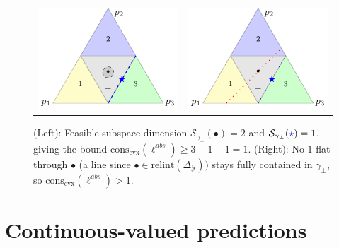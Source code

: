 \documentclass[anon,12pt]{colt2021} %
\newcommand{\simplex}{\Delta_\Y}
\newcommand{\relint}[1]{\mathrm{relint}(#1)}
\newcommand{\conscvx}{\mathrm{cons}_\mathrm{cvx}}
\newcommand{\Sc}{\mathcal{S}}  %
\newcommand{\Y}{\mathcal{Y}}
\begin{document}
\begin{figure}[htb]
	\centering
	\begin{tabular}{cc}
		\includegraphics[width=.45\textwidth]{tikz/fsd-bound.pdf} &
		\includegraphics[width=.45\textwidth]{tikz/flats-bound.pdf} \\
	\end{tabular}
	\caption{(Left): Feasible subspace dimension $\Sc_{\gamma_\bot}(\bullet) = 2$ and $\Sc_{\gamma_\bot}({\color{blue}\star}) = 1$, giving the bound $\conscvx(\ell^{abs}) \geq 3- 1-1 = 1$.  (Right): No $1$-flat through $\bullet$ (a line since $\bullet \in \relint{\simplex})$  stays fully contained in $\gamma_\bot$, so $\conscvx(\ell^{abs}) > 1$.}
	\label{fig:fsd-flats-abstain}
\end{figure}

\section{Continuous-valued predictions}\label{sec:contin-consis}
\end{document}
